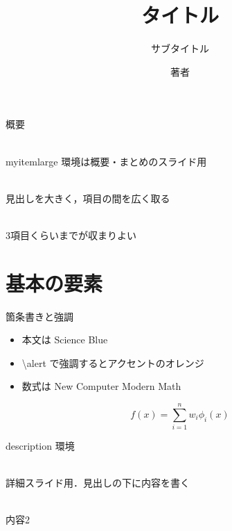 \documentclass{beamer}
\title{タイトル}
\subtitle{サブタイトル}
\author{著者}
\institute{所属}
\begin{document}
\maketitle

\begin{frame}{概要}
    \begin{myitemlarge}
        \item[背景]\hspace{0pt}\\[-1.3em]
        myitemlarge 環境は概要・まとめのスライド用
        \item[提案]\hspace{0pt}\\[-1.3em]
        見出しを大きく，項目の間を広く取る
        \item[結果]\hspace{0pt}\\[-1.3em]
        3項目くらいまでが収まりよい
    \end{myitemlarge}
\end{frame}

\section{基本の要素}

\begin{frame}{箇条書きと強調}
    \begin{itemize}
        \item 本文は Science Blue
        \item \alert{\textbackslash alert} で強調するとアクセントのオレンジ
        \item 数式は New Computer Modern Math
    \end{itemize}
    \[
        f(x) = \sum_{i=1}^{n} w_i \phi_i(x)
    \]
\end{frame}

\begin{frame}{description 環境}
    \begin{myitem}
        \item[見出し1]\hspace{0pt}\\[-1.3em]
        詳細スライド用．見出しの下に内容を書く
        \item[見出し2]\hspace{0pt}\\[-1.3em]
        内容2
    \end{myitem}
\end{frame}
\end{document}
